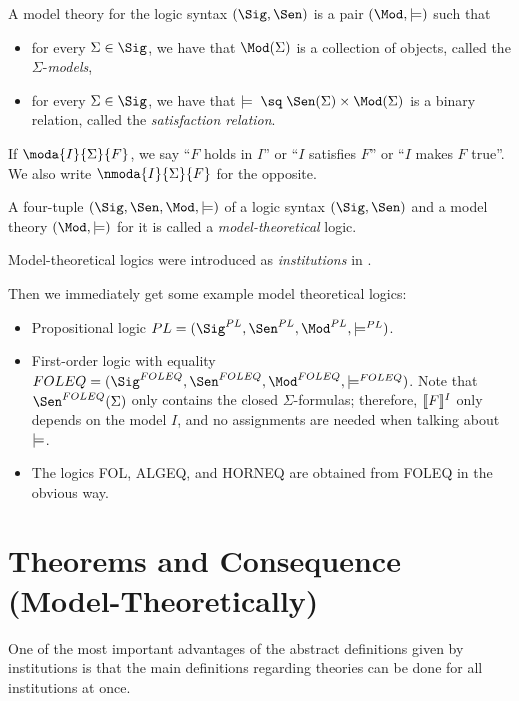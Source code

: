 \begin{definition}\label{def:mt:abs}
A model theory for the logic syntax $(\Sig,\Sen)$ is a pair $(\Mod,\md)$ such that
\begin{itemize}
\item for every $\Sigma\in\Sig$, we have that $\Mod(\Sigma)$ is a collection of objects, called the $\Sigma$-\emph{models},
\item for every $\Sigma\in\Sig$, we have that $\md\;\sq\;\Sen(\Sigma)\times\Mod(\Sigma)$ is a binary relation, called the \emph{satisfaction relation}.
\end{itemize}
If $\moda{I}{\Sigma}{F}$, we say ``$F$ holds in $I$'' or ``$I$ satisfies $F$'' or ``$I$ makes $F$ true''. We also write $\nmoda{I}{\Sigma}{F}$ for the opposite.

A four-tuple $(\Sig,\Sen,\Mod,\md)$ of a logic syntax $(\Sig,\Sen)$ and a model theory $(\Mod,\md)$ for it is called a \emph{model-theoretical} logic.
\end{definition}

\begin{remark}
Model-theoretical logics were introduced as \emph{institutions} in \cite{institutions}.
\end{remark}

\begin{example}\label{ex:mt:abs}
Then we immediately get some example model theoretical logics:
\begin{itemize}
\item Propositional logic $PL=(\Sig^{PL},\Sen^{PL},\Mod^{PL},\md^{PL})$.
\item First-order logic with equality $FOLEQ=(\Sig^{FOLEQ},\Sen^{FOLEQ},\Mod^{FOLEQ},\md^{FOLEQ})$. Note that $\Sen^{FOLEQ}(\Sigma)$ only contains the closed $\Sigma$-formulas; therefore, $\llbracket F\rrbracket^{I}$ only depends on the model $I$, and no assignments are needed when talking about $\models$.
\item The logics FOL, ALGEQ, and HORNEQ are obtained from FOLEQ in the obvious way.
\end{itemize}
\end{example}


\section{Theorems and Consequence (Model-Theoretically)}\label{sec:fol:thymt}

One of the most important advantages of the abstract definitions given by institutions is that the main definitions regarding theories can be done for all institutions at once.

